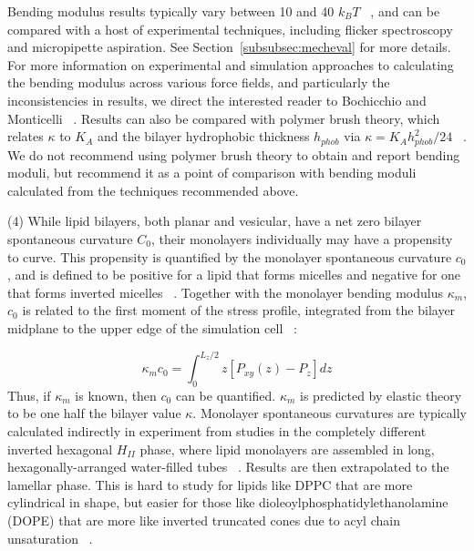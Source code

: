 \documentclass[9pt,bestpractices,pubversion]{livecoms}
\begin{document}
Bending modulus results typically vary between 10 and 40 $k_BT$ ~\cite{Venable2015}, and can be compared with a host of experimental techniques, including flicker spectroscopy and micropipette aspiration.
See Section~\ref{subsubsec:mecheval} for more details.
For more information on experimental and simulation approaches to calculating the bending modulus across various force fields, and particularly the inconsistencies in results, we direct the interested reader to Bochicchio and Monticelli ~\cite{Bochicchio2016}.
Results can also be compared with polymer brush theory, which relates $\kappa$ to $K_A$ and the bilayer hydrophobic thickness $h_{phob}$ via $\kappa = K_Ah_{phob}^2/24$ ~\cite{Rawicz2000}.
We do not recommend using polymer brush theory to obtain and report bending moduli, but recommend it as a point of comparison with bending moduli calculated from the techniques recommended above.

(4) While lipid bilayers, both planar and vesicular, have a net zero bilayer spontaneous curvature $C_0$, their monolayers individually may have a propensity to curve.
This propensity is quantified by the monolayer spontaneous curvature $c_0$, and is defined to be positive for a lipid that forms micelles and negative for one that forms inverted micelles ~\cite{Venable2015}.
Together with the monolayer bending modulus $\kappa_m$, $c_0$ is related to the first moment of the stress profile, integrated from the bilayer midplane to the upper edge of the simulation cell  ~\cite{Safran1994}:

\begin{equation}\label{eq:12}
	\kappa_m c_0 = \int_{0}^{L_z/2} z[P_{xy}(z) - P_z]dz
\end{equation}
Thus, if $\kappa_m$ is known, then $c_0$ can be quantified.
$\kappa_m$ is predicted by elastic theory to be one half the bilayer value $\kappa$.
Monolayer spontaneous curvatures are typically calculated indirectly in experiment from studies in the completely different inverted hexagonal $H_{II}$ phase, where lipid monolayers are assembled in long, hexagonally-arranged water-filled tubes ~\cite{Gruner1986}.
Results are then extrapolated to the lamellar phase.
This is hard to study for lipids like DPPC that are more cylindrical in shape, but easier for those like dioleoylphosphatidylethanolamine (DOPE) that are more like inverted truncated cones due to acyl chain unsaturation ~\cite{Venable2015,Israelachvili2011}.
\end{document}
